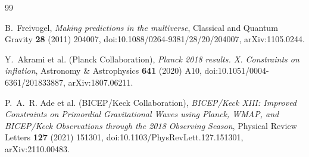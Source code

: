 \documentclass[11pt]{article}
\begin{document}
\begin{thebibliography}{99}

B.~Freivogel,
\emph{Making predictions in the multiverse},
Classical and Quantum Gravity \textbf{28} (2011) 204007,
doi:10.1088/0264-9381/28/20/204007,
arXiv:1105.0244.

Y.~Akrami et al. (Planck Collaboration),
\emph{Planck 2018 results. X. Constraints on inflation},
Astronomy \& Astrophysics \textbf{641} (2020) A10,
doi:10.1051/0004-6361/201833887,
arXiv:1807.06211.

P.~A.~R. Ade et al. (BICEP/Keck Collaboration),
\emph{BICEP/Keck XIII: Improved Constraints on Primordial Gravitational
Waves using Planck, WMAP, and BICEP/Keck Observations through the 2018
Observing Season},
Physical Review Letters \textbf{127} (2021) 151301,
doi:10.1103/PhysRevLett.127.151301,
arXiv:2110.00483.

\end{thebibliography}
\end{document}
